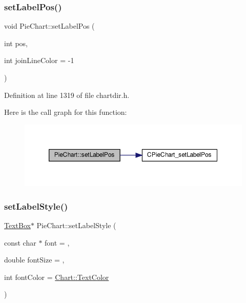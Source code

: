 \subsubsection{\texorpdfstring{set\+Label\+Pos()}{setLabelPos()}}
{\footnotesize\ttfamily void Pie\+Chart\+::set\+Label\+Pos (\begin{DoxyParamCaption}\item[{int}]{pos,  }\item[{int}]{join\+Line\+Color = {\ttfamily -\/1} }\end{DoxyParamCaption})\hspace{0.3cm}{\ttfamily [inline]}}



Definition at line 1319 of file chartdir.\+h.

Here is the call graph for this function\+:
\nopagebreak
\begin{figure}[H]
\begin{center}
\leavevmode
\includegraphics[width=350pt]{class_pie_chart_ac4b3730538d6f8dffea410599d1bae20_cgraph}
\end{center}
\end{figure}
\mbox{\label{class_pie_chart_a7881b5842d44d84aed560a1da2b33126}} 
\subsubsection{\texorpdfstring{set\+Label\+Style()}{setLabelStyle()}}
{\footnotesize\ttfamily \hyperlink{class_text_box}{Text\+Box}$\ast$ Pie\+Chart\+::set\+Label\+Style (\begin{DoxyParamCaption}\item[{const char $\ast$}]{font = {},  }\item[{double}]{font\+Size = {},  }\item[{int}]{font\+Color = {\ttfamily \hyperlink{namespace_chart_abee0d882fdc9ad0b001245ad9fc64011a879e14f2f5024caccc047374342321ef}{Chart\+::\+Text\+Color}} }\end{DoxyParamCaption})\hspace{0.3cm}{\ttfamily [inline]}}



